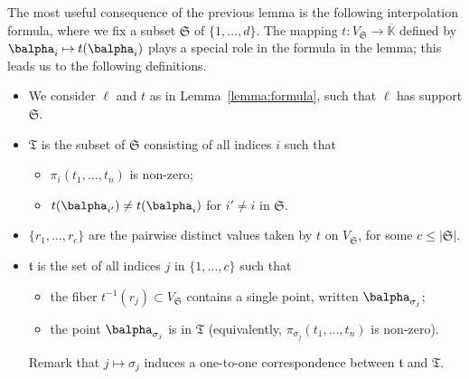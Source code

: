 \documentclass[12pt]{article}
\def\Kbar {{\ensuremath{\overline{\mathbb{K}}}}}
\begin{document}
\noindent 
The most useful consequence of the previous lemma is the following
interpolation formula, where we fix a subset $\mathfrak{S}$ of 
$\{1,\dots,d\}$. The mapping $t:V_\mathfrak{S} \to \Kbar$
defined by $\balpha_i \mapsto t(\balpha_{i})$ plays a special role in
the formula in the lemma; this leads us to the following definitions.
\begin{itemize}
	\item We consider $\ell$ and $t$ as in Lemma~\ref{lemma:formula}, such
	that $\ell$ has support $\mathfrak{S}$.
	\item $\mathfrak{T}$ is the subset of $\mathfrak{S}$ consisting of
	all indices $i$ such that 
	\begin{itemize}
		\item $\pi_i(t_1,\dots,t_n)$ is non-zero;
		\item $t(\balpha_{i'}) \ne t(\balpha_i)$ for $i' \ne i$ in $\mathfrak{S}$.
	\end{itemize}
	\item $\{r_1,\dots,r_c\}$ are the pairwise distinct values taken by $t$ on
	$V_\mathfrak{S}$, for some $c \le |\mathfrak{S}|$.
	\item $\mathfrak{t}$ is the set of all indices $j$ in
	$\{1,\dots,c\}$ such that
	\begin{itemize}
		\item the fiber $t^{-1}(r_j) \subset V_{\mathfrak{S}}$ contains a single
		point, written $\balpha_{\sigma_j}$;
		\item the point $\balpha_{\sigma_j}$ is in $\mathfrak{T}$
		(equivalently,  $\pi_{\sigma_j}(t_1,\dots,t_n)$ is non-zero).
	\end{itemize}
	Remark that $j \mapsto \sigma_j$ induces a one-to-one correspondence
	between  $\mathfrak{t}$ and  $\mathfrak{T}$.
\end{itemize}
\end{document}
